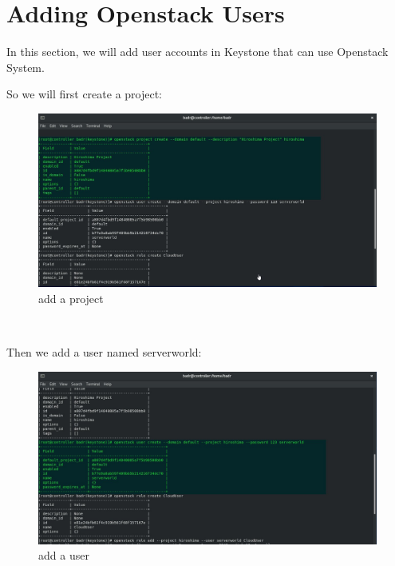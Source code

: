 \chapter{Adding Openstack Users}
In this section, we will add user accounts in Keystone that can
use Openstack System.
\begin{spacing}{1.2}

\par So we will first create a project:
\\
\begin{figure}[!htb] 
\begin{center} 
\includegraphics[width=1\linewidth]{Cloud/Adding Openstack Users/add a project} 
\end{center} 
\caption{add a project} 
\end{figure} 
\FloatBarrier
\\

\par Then we add a user named serverworld:
\\
\begin{figure}[!htb] 
\begin{center} 
\includegraphics[width=1\linewidth]{Cloud/Adding Openstack Users/add a user} 
\end{center} 
\caption{add a user} 
\end{figure} 
\FloatBarrier



\end{spacing}
